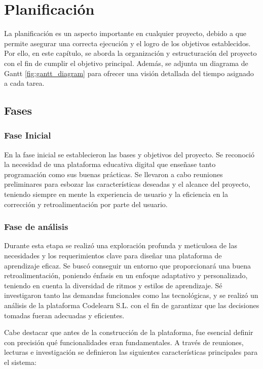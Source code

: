 \chapter{Planificación} \label{chap:planification}

La planificación es un aspecto importante en cualquier proyecto, debido a que permite asegurar una correcta ejecución y el logro de los objetivos establecidos. Por ello, en este capítulo, se aborda la organización y estructuración del proyecto con el fin de cumplir el objetivo principal. Además, se adjunta un diagrama de Gantt \ref{fig:gantt_diagram} para ofrecer una visión detallada del tiempo asignado a cada tarea.

\section{Fases}

\subsection{Fase Inicial}

En la fase inicial se establecieron las bases y objetivos del proyecto. Se reconoció la necesidad de una plataforma educativa digital que enseñase tanto programación como sus buenas prácticas. Se llevaron a cabo reuniones preliminares para esbozar las características deseadas y el alcance del proyecto, teniendo siempre en mente la experiencia de usuario y la eficiencia en la corrección y retroalimentación por parte del usuario.

\subsection{Fase de análisis}

Durante esta etapa se realizó una exploración profunda y meticulosa de las necesidades y los requerimientos clave para diseñar una plataforma de aprendizaje eficaz. Se buscó conseguir un entorno que proporcionará una buena retroalimentación, poniendo énfasis en un enfoque adaptativo y personalizado, teniendo en cuenta la diversidad de ritmos y estilos de aprendizaje. Sé investigaron tanto las demandas funcionales como las tecnológicas, y se realizó un análisis de la plataforma Codelearn S.L. con el fin de garantizar que las decisiones tomadas fueran adecuadas y eficientes.

Cabe destacar que antes de la construcción de la plataforma, fue esencial definir con precisión qué funcionalidades eran fundamentales. A través de reuniones, lecturas e investigación se definieron las siguientes características principales para el sistema:

